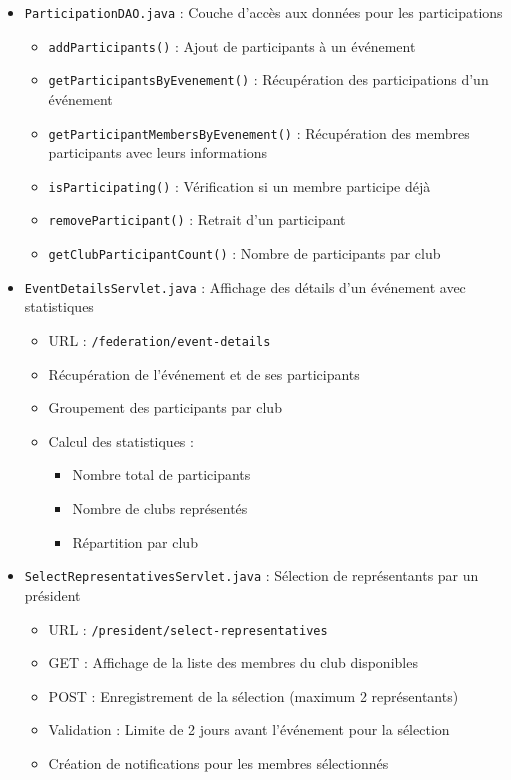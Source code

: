 \documentclass[12pt,a4paper]{article}
\begin{document}
\begin{itemize}
    \item \texttt{ParticipationDAO.java} : Couche d'accès aux données pour les participations
    \begin{itemize}
        \item \texttt{addParticipants()} : Ajout de participants à un événement
        \item \texttt{getParticipantsByEvenement()} : Récupération des participations d'un événement
        \item \texttt{getParticipantMembersByEvenement()} : Récupération des membres participants avec leurs informations
        \item \texttt{isParticipating()} : Vérification si un membre participe déjà
        \item \texttt{removeParticipant()} : Retrait d'un participant
        \item \texttt{getClubParticipantCount()} : Nombre de participants par club
    \end{itemize}
    
    \item \texttt{EventDetailsServlet.java} : Affichage des détails d'un événement avec statistiques
    \begin{itemize}
        \item URL : \texttt{/federation/event-details}
        \item Récupération de l'événement et de ses participants
        \item Groupement des participants par club
        \item Calcul des statistiques :
        \begin{itemize}
            \item Nombre total de participants
            \item Nombre de clubs représentés
            \item Répartition par club
        \end{itemize}
    \end{itemize}
    
    \item \texttt{SelectRepresentativesServlet.java} : Sélection de représentants par un président
    \begin{itemize}
        \item URL : \texttt{/president/select-representatives}
        \item GET : Affichage de la liste des membres du club disponibles
        \item POST : Enregistrement de la sélection (maximum 2 représentants)
        \item Validation : Limite de 2 jours avant l'événement pour la sélection
        \item Création de notifications pour les membres sélectionnés
    \end{itemize}
\end{itemize}
\end{document}
